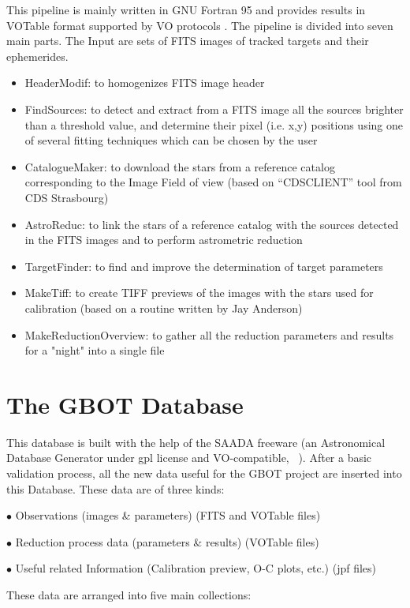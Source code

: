 This pipeline is mainly written in GNU Fortran 95 and provides results in VOTable format supported by VO protocols \citep{Bouquillon_2012}. The pipeline is divided into seven main parts. The Input are sets of FITS images of tracked targets and their ephemerides.
\begin{itemize}
\item HeaderModif: to homogenizes FITS image header
\item FindSources: to detect and extract from a FITS image all the sources brighter than a threshold value, and determine their pixel (i.e. x,y) positions using one of several fitting techniques which can be chosen by the user
\item CatalogueMaker: to download the stars from a reference catalog corresponding to the Image Field of view (based on “CDSCLIENT” tool from CDS Strasbourg)
\item AstroReduc: to link the stars of a reference catalog with the sources detected in the FITS images and to perform astrometric reduction
\item TargetFinder: to find and improve the determination of target parameters
\item MakeTiff: to create TIFF previews of the images with the stars used for calibration (based on a routine written by Jay Anderson)
\item MakeReductionOverview: to gather all the reduction parameters and results for a "night" into a single file
\end{itemize}


\section{The GBOT Database}

This database is built with the help of the SAADA freeware (an Astronomical Database Generator under gpl license and VO‑compatible, ~\cite{michel12}). After a basic validation process, all the new data useful for the GBOT project are inserted into this Database. These data are of three kinds:

$\bullet$ Observations (images \& parameters) (FITS and VOTable files)

$\bullet$ Reduction process data (parameters \& results) (VOTable files)

$\bullet$ Useful related Information (Calibration preview, O-C plots, etc.) (jpf files)
\newpage

\noindent These data are arranged into five main collections: 

